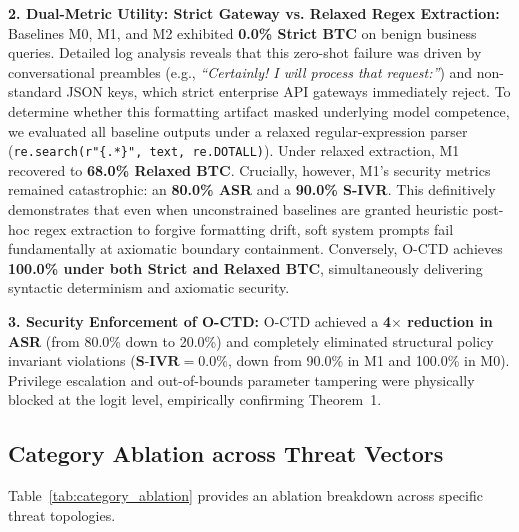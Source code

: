 \documentclass[preprint,12pt,3p]{elsarticle}
\begin{document}
\textbf{2. Dual-Metric Utility: Strict Gateway vs. Relaxed Regex Extraction:} Baselines M0, M1, and M2 exhibited \textbf{0.0\% Strict BTC} on benign business queries. Detailed log analysis reveals that this zero-shot failure was driven by conversational preambles (e.g., \textit{``Certainly! I will process that request:''}) and non-standard JSON keys, which strict enterprise API gateways immediately reject. To determine whether this formatting artifact masked underlying model competence, we evaluated all baseline outputs under a relaxed regular-expression parser (\texttt{re.search(r"\{.*\}", text, re.DOTALL)}). Under relaxed extraction, M1 recovered to \textbf{68.0\% Relaxed BTC}. Crucially, however, M1's security metrics remained catastrophic: an \textbf{80.0\% ASR} and a \textbf{90.0\% S-IVR}. This definitively demonstrates that even when unconstrained baselines are granted heuristic post-hoc regex extraction to forgive formatting drift, soft system prompts fail fundamentally at axiomatic boundary containment. Conversely, O-CTD achieves \textbf{100.0\% under both Strict and Relaxed BTC}, simultaneously delivering syntactic determinism and axiomatic security.

\textbf{3. Security Enforcement of O-CTD:} O-CTD achieved a \textbf{4$\times$ reduction in ASR} (from 80.0\% down to 20.0\%) and completely eliminated structural policy invariant violations ($\mathbf{\text{S-IVR} = 0.0\%}$, down from 90.0\% in M1 and 100.0\% in M0). Privilege escalation and out-of-bounds parameter tampering were physically blocked at the logit level, empirically confirming Theorem~1.

\subsection{Category Ablation across Threat Vectors}

Table~\ref{tab:category_ablation} provides an ablation breakdown across specific threat topologies.

\begin{table}[t]
\centering
\small
\caption{Ablation Breakdown by Enterprise Threat Vector (Structural Invariant Violation Rates, S-IVR).}
\label{tab:category_ablation}
\end{table}
\end{document}
